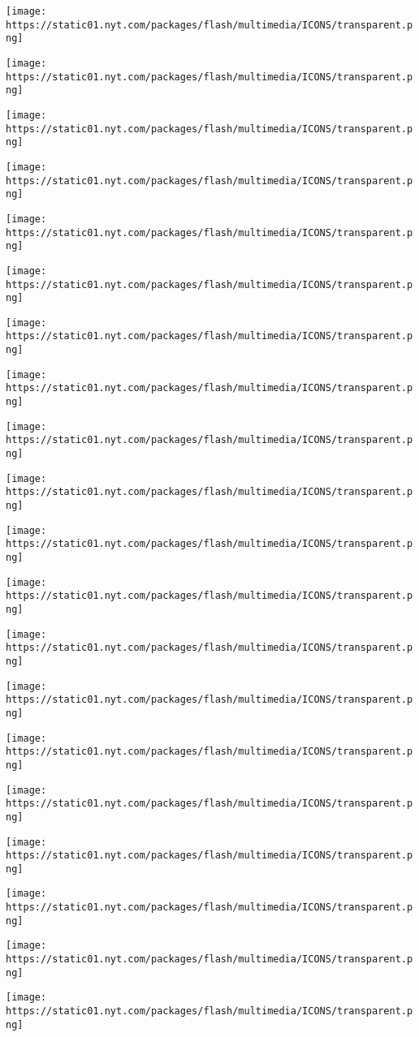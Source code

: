 \texttt{[image: https://static01.nyt.com/packages/flash/multimedia/ICONS/transparent.png]}

\texttt{[image: https://static01.nyt.com/packages/flash/multimedia/ICONS/transparent.png]}

\texttt{[image: https://static01.nyt.com/packages/flash/multimedia/ICONS/transparent.png]}

\texttt{[image: https://static01.nyt.com/packages/flash/multimedia/ICONS/transparent.png]}

\texttt{[image: https://static01.nyt.com/packages/flash/multimedia/ICONS/transparent.png]}

\texttt{[image: https://static01.nyt.com/packages/flash/multimedia/ICONS/transparent.png]}

\texttt{[image: https://static01.nyt.com/packages/flash/multimedia/ICONS/transparent.png]}

\texttt{[image: https://static01.nyt.com/packages/flash/multimedia/ICONS/transparent.png]}

\texttt{[image: https://static01.nyt.com/packages/flash/multimedia/ICONS/transparent.png]}

\texttt{[image: https://static01.nyt.com/packages/flash/multimedia/ICONS/transparent.png]}

\texttt{[image: https://static01.nyt.com/packages/flash/multimedia/ICONS/transparent.png]}

\texttt{[image: https://static01.nyt.com/packages/flash/multimedia/ICONS/transparent.png]}

\texttt{[image: https://static01.nyt.com/packages/flash/multimedia/ICONS/transparent.png]}

\texttt{[image: https://static01.nyt.com/packages/flash/multimedia/ICONS/transparent.png]}

\texttt{[image: https://static01.nyt.com/packages/flash/multimedia/ICONS/transparent.png]}

\texttt{[image: https://static01.nyt.com/packages/flash/multimedia/ICONS/transparent.png]}

\texttt{[image: https://static01.nyt.com/packages/flash/multimedia/ICONS/transparent.png]}

\texttt{[image: https://static01.nyt.com/packages/flash/multimedia/ICONS/transparent.png]}

\texttt{[image: https://static01.nyt.com/packages/flash/multimedia/ICONS/transparent.png]}

\texttt{[image: https://static01.nyt.com/packages/flash/multimedia/ICONS/transparent.png]}

